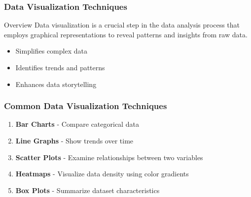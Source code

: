 \documentclass[aspectratio=169]{beamer}
\begin{document}
\begin{frame}
    \frametitle{Data Visualization Techniques}
    \begin{block}{Overview}
        Data visualization is a crucial step in the data analysis process that employs graphical representations to reveal patterns and insights from raw data.
    \end{block}
    \begin{itemize}
        \item Simplifies complex data
        \item Identifies trends and patterns
        \item Enhances data storytelling
    \end{itemize}
\end{frame}

\begin{frame}
    \frametitle{Common Data Visualization Techniques}
    \begin{enumerate}
        \item \textbf{Bar Charts} - Compare categorical data
        \item \textbf{Line Graphs} - Show trends over time
        \item \textbf{Scatter Plots} - Examine relationships between two variables
        \item \textbf{Heatmaps} - Visualize data density using color gradients
        \item \textbf{Box Plots} - Summarize dataset characteristics
    \end{enumerate}
\end{frame}
\end{document}
